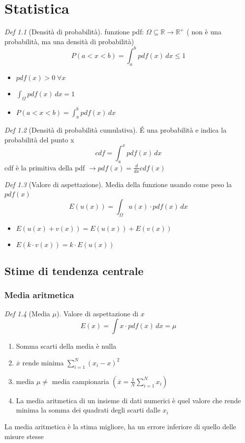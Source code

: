 \documentclass[12pt]{report}
\theoremstyle{remark}
\theoremstyle{theorem}
\newtheorem*{Def}{Def}
\begin{document}
\chapter{Statistica}
       

\begin{Def}[Densità di probabilità]
	funzione pdf: $\Omega \subseteq \mathbb{R} \to \mathbb{R}^+$ ( non è una probabilità, ma una densità di probabilità)
	\[P(a<x<b) = \int_{a}^{b} pdf(x) \, dx \le 1\]
	\begin{itemize}
		\item $pdf(x)>0 \; \forall x$
		\item $\int_\Omega pdf(x) \, dx = 1$
		\item $P(a<x<b) = \int_a^b pdf(x) \, dx$
	\end{itemize}
\end{Def}

\begin{Def}[Densità di probabilità cumulativa]
	\' E una probabilità e indica la probabilità del punto x
	\[cdf = \int_a^x pdf(x) \, dx\]
	cdf è la primitiva della pdf $\to pdf(x) = \frac{d}{dx} cdf(x)$
\end{Def}

\begin{Def}[Valore di aspettazione]
	Media della funzione usando come peso la $pdf(x)$
	\[E(u(x))= \int_\Omega u(x)\cdot pdf(x)\, dx\]
	\begin{itemize}
		\item $E(u(x)+v(x)) = E(u(x))+E(v(x))$
		\item $E(k\cdot v(x)) = k\cdot E(u(x))$
	\end{itemize}
\end{Def}

\section{Stime di tendenza centrale}
\subsection{Media aritmetica}
\begin{Def}[Media $\mu$]
	Valore di aspettazione di $x$ 
	\[E(x) = \int x\cdot pdf(x) \, dx = \mu\]
	\begin{enumerate}
		\item Somma scarti della media è nulla
		\item $\overline{x}$ rende minima $\displaystyle \sum_{i=1}^N {(x_i-x)}^2$
		\item media $\mu \neq$ media campionaria $\left(\displaystyle\overline{x} = \frac{1}{N} \sum_{i=1}^N x_i\right)$
  \item La media aritmetica di un insieme di dati numerici è quel valore che rende minima la somma dei quadrati degli scarti dalle $x_i$
	\end{enumerate}
La media aritmetica è la stima migliore, ha un errore inferiore di quello delle misure stesse
\end{Def}
\end{document}
